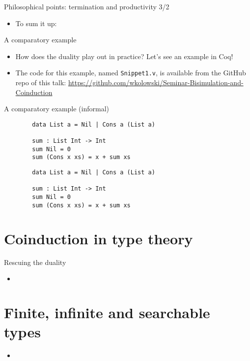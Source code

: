 \documentclass{beamer}
\begin{document}
\begin{frame}{Philosophical points: termination and productivity 3/2}
\begin{itemize}
	\item To sum it up:
\end{itemize}
\end{frame}

\begin{frame}{A comparatory example}
\begin{itemize}
	\item How does the duality play out in practice? Let's see an example in Coq!
	\item The code for this example, named \texttt{Snippet1.v}, is available from the GitHub repo of this talk: \url{https://github.com/wkolowski/Seminar-Bisimulation-and-Coinduction}
\end{itemize}
\end{frame}

\begin{frame}[fragile]{A comparatory example (informal)}
\noindent
\begin{minipage}[l]{0.45\linewidth}
	\begin{verbatim}
		data List a = Nil | Cons a (List a)

		sum : List Int -> Int
		sum Nil = 0
		sum (Cons x xs) = x + sum xs
	\end{verbatim}
\end{minipage}
\noindent
\begin{minipage}[b]{0.45\linewidth}
	\begin{verbatim}
		data List a = Nil | Cons a (List a)

		sum : List Int -> Int
		sum Nil = 0
		sum (Cons x xs) = x + sum xs
	\end{verbatim}
\end{minipage}
\end{frame}



\section{Coinduction in type theory}

\begin{frame}{Rescuing the duality}
\begin{itemize}
	\item 
\end{itemize}
\end{frame}

\section{Finite, infinite and searchable types}

\begin{frame}{}
\begin{itemize}
	\item 
\end{itemize}
\end{frame}
\end{document}
